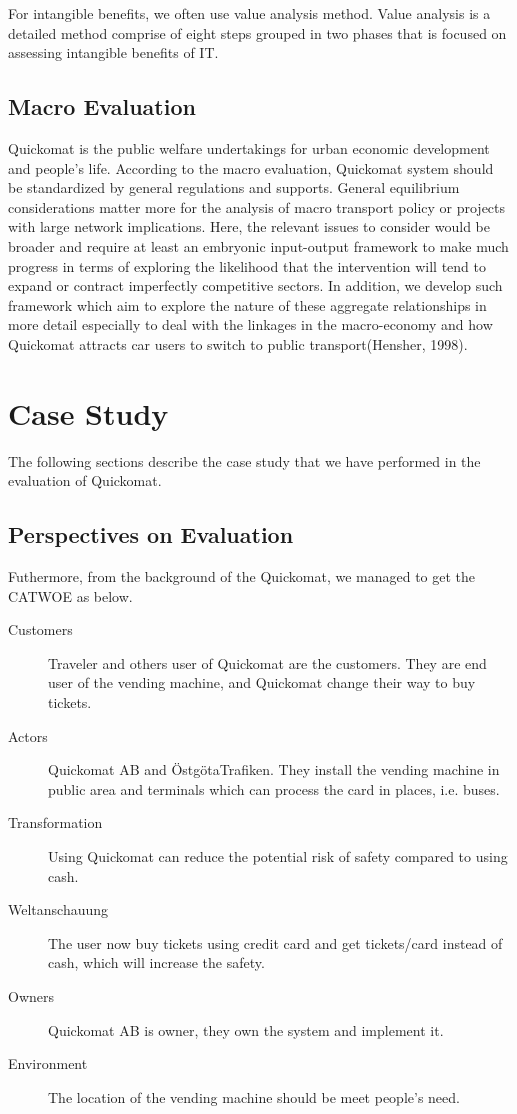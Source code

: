 \documentclass[twocolumn]{article}
\begin{document}
For intangible benefits, we often use value analysis method. Value analysis is a detailed method comprise of eight steps grouped in two phases that is focused on assessing intangible benefits of IT.

\subsection{Macro Evaluation}
Quickomat is the public welfare undertakings for urban economic development and people’s life. According to the macro evaluation, Quickomat system should be standardized by general regulations and supports. General equilibrium considerations matter more for the analysis of macro transport policy or projects with large network implications. Here, the relevant issues to consider would be broader and require at least an embryonic input-output framework to make much progress in terms of exploring the likelihood that the intervention will tend to expand or contract imperfectly competitive sectors. In addition, we develop such framework which aim to explore the nature of these aggregate relationships in more detail especially to deal with the linkages in the macro-economy and how Quickomat attracts car users to switch to public transport(Hensher, 1998).

\section{Case Study}
The following sections describe the case study that we have performed in the evaluation of  Quickomat.

\subsection{Perspectives on Evaluation}

Futhermore, from the background of the Quickomat, we managed to get the CATWOE as below.
\begin{description}
  \item[Customers]
    Traveler and others user of Quickomat are the customers. They are end user of the vending machine, and Quickomat change their way to buy tickets.
  \item[Actors]
    Quickomat AB and ÖstgötaTrafiken. They install the vending machine in public area and terminals which can process the card in places, i.e. buses.
  \item[Transformation]
    Using Quickomat can reduce the potential risk of safety compared to using cash.
  \item[Weltanschauung]
    The user now buy tickets using credit card and get tickets/card instead of cash, which will increase the safety.
  \item[Owners]
    Quickomat AB is owner, they own the system and implement it.
  \item[Environment]
    The location of the vending machine should be meet people’s need.
\end{description}
\end{document}
